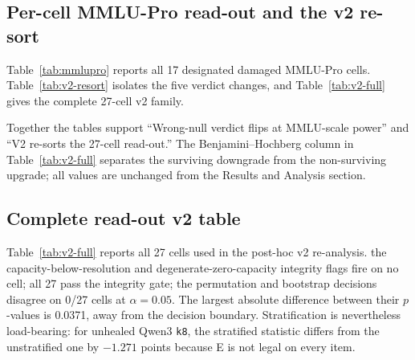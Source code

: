 




\subsection{Per-cell MMLU-Pro read-out and the v2 re-sort}
\label{app:mmlupro-and-resort}

Table~\ref{tab:mmlupro} reports all 17 designated damaged MMLU-Pro cells.
Table~\ref{tab:v2-resort} isolates the five verdict changes, and
Table~\ref{tab:v2-full} gives the complete 27-cell v2 family.





Together the tables support ``Wrong-null verdict flips at MMLU-scale power'' and
``V2 re-sorts the 27-cell read-out.''  The Benjamini--Hochberg column in
Table~\ref{tab:v2-full} separates the surviving downgrade from the
non-surviving upgrade; all values are unchanged from the Results and Analysis
section.

\FloatBarrier



\FloatBarrier

\subsection{Complete read-out v2 table}

Table~\ref{tab:v2-full} reports all 27 cells used in the post-hoc v2 re-analysis. the capacity-below-resolution and degenerate-zero-capacity integrity flags fire on no cell; all 27 pass the integrity gate; the permutation and bootstrap decisions disagree on 0/27 cells at $\alpha=0.05$. The largest absolute difference between their $p$-values is 0.0371, away from the decision boundary. Stratification is nevertheless load-bearing: for unhealed Qwen3 \texttt{k8}, the stratified statistic differs from the unstratified one by $-1.271$ points because E is not legal on every item.

